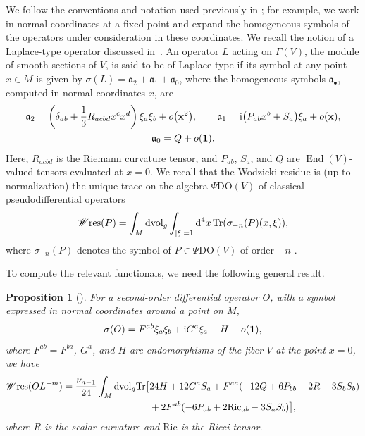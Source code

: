 \documentclass[pdftex]{sigma}
\numberwithin{equation}{section}
\newtheorem{Proposition}[Theorem]{Proposition}
\theoremstyle{definition}
\def\W{\mathscr{W} \mathrm{res}}
\def\Tr{\mathrm{Tr}}
\def\PDO{\Psi\mathrm{DO}}
\def\dv{\mathrm{dvol}_g}
\begin{document}
We follow the conventions and notation used previously in \cite{dabrowski2023,bochniak2025}; for example, we work in normal coordinates at a fixed point and expand the homogeneous symbols of the operators under consideration in these coordinates. We recall the notion of a Laplace-type operator discussed in~\cite{bochniak2025}. An operator $L$ acting on $\Gamma(V)$, the module of smooth sections of $V$, is said to be of Laplace type if its symbol at any point $x \in M$ is given by $\sigma(L) = \mathfrak{a}_2 + \mathfrak{a}_1 + \mathfrak{a}_0$, where the homogeneous symbols $\mathfrak{a}_\bullet$, computed in normal coordinates $x$, are
\begin{gather}
		\mathfrak{a}_2= \left(\delta_{ab}+\frac{1}{3}R_{acbd}x^c x^d \right)\xi_a\xi_b + o\bigl({\bf x}^2\bigr),\qquad
		\mathfrak{a}_1={\rm i}\bigl(P_{ab}x^b + S_a\bigr)\xi_a +o({\bf x}),\nonumber\\
		\mathfrak{a}_0=Q+o({\bf 1}).\label{symbolL}
\end{gather}
Here, $R_{acbd}$ is the Riemann curvature tensor, and $P_{ab}$, $S_a$, and $Q$ are $\operatorname{End}(V)$-valued tensors evaluated at $x=0$. We recall that the Wodzicki residue \cite{Wodzicki} is (up to normalization) the unique trace on the algebra $\PDO(V)$ of classical pseudodifferential operators
\[
	\W(P)=\int_M\dv \int_{|\xi|=1} {\rm d}^4x \, \Tr(\sigma_{-n}(P)(x,\xi)),
\]
where $\sigma_{-n}(P)$ denotes the symbol of $P \in \PDO(V)$ of order $-n$ \cite{Gilkey}.

To compute the relevant functionals, we need the following general result.

\begin{Proposition}[{\cite[Proposition~I.2]{bochniak2025}}]
	\label{prop:main}
	For a second-order differential operator $O$, with a symbol expressed in normal coordinates around a point on $M$,
	\[\sigma(O)=F^{ab}\xi_a\xi_b + {\rm i} G^a \xi_a +H + o({\bf 1}),\]
	where $F^{ab} = F^{ba}$, $G^a$, and $H$ are endomorphisms of the fiber $V$ at the point $x = 0$, we have
	\begin{align*}%
		\W(OL^{-m})={}&\frac{\nu_{n-1}}{24}\int_M \dv\Tr \bigl[24H +12 G^aS_a +F^{aa}(-12 Q+ 6P_{bb}-2 R - 3 S_b S_b) \\
		& \hphantom{\frac{\nu_{n-1}}{24}\int_M \dv\Tr \bigl[}{} + 2 F^{ab}(-6 P_{ab}+2 \mathrm{Ric}_{ab}-3S_a S_b)\bigr],
	\end{align*}
where $R$ is the scalar curvature and $\mathrm{Ric}$ is the Ricci tensor.
\end{Proposition}
\end{document}
